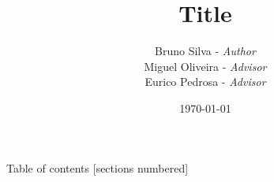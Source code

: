 \documentclass{beamer}
\date{\today}
\author{
  Bruno Silva      - \textit{Author}\\
  Miguel Oliveira  - \textit{Advisor}\\
  Eurico Pedrosa  - \textit{Advisor}\\
}
\institute{University of Aveiro\\PhD. in Mechanical Engineering.}
\title{
  Title
}
\begin{document}
\maketitle


\begin{frame}{Table of contents}
  [sections numbered]
  \tableofcontents
\end{frame}





\end{document}
